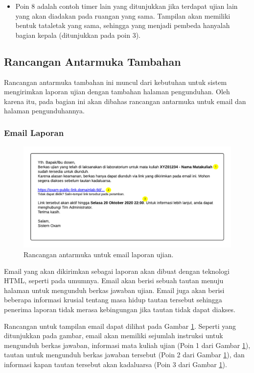 \begin{itemize}
        \item Poin 8 adalah contoh timer lain yang ditunjukkan jika terdapat
            ujian lain yang akan diadakan pada ruangan yang sama. Tampilan akan
            memiliki bentuk tataletak yang sama, sehingga yang menjadi pembeda
            hanyalah bagian kepala (ditunjukkan pada poin 3).
    \end{itemize}
    
    
\subsection{Rancangan Antarmuka Tambahan}
    Rancangan antarmuka tambahan ini muncul dari kebutuhan untuk sistem
    mengirimkan laporan ujian dengan tambahan halaman pengunduhan. Oleh karena
    itu, pada bagian ini akan dibahas rancangan antarmuka untuk email dan
    halaman pengunduhannya.
    
\subsubsection{Email Laporan}
    \begin{figure}
        \centering
        \includegraphics[width=0.7\paperwidth]{Gambar/mockups/Mockup--Tambahan.pdf}
        \caption{Rancangan antarmuka untuk email laporan ujian.}
        \label{fig:mockup_addition_email}
    \end{figure}
    Email yang akan dikirimkan sebagai laporan akan dibuat dengan teknologi
    HTML, seperti pada umumnya. Email akan berisi sebuah tautan menuju halaman
    untuk mengunduh berkas jawaban ujian. Email juga akan berisi beberapa
    informasi krusial tentang masa hidup tautan tersebut sehingga penerima
    laporan tidak merasa kebingungan jika tautan tidak dapat diakses.
    
    Rancangan untuk tampilan email dapat dilihat pada Gambar
    \ref{fig:mockup_addition_email}. Seperti yang ditunjukkan pada gambar, email
    akan memiliki sejumlah instruksi untuk mengunduh berkas jawaban, informasi
    mata kuliah ujian (Poin 1 dari Gambar \ref{fig:mockup_addition_email}),
    tautan untuk mengunduh berkas jawaban tersebut (Poin 2 dari Gambar
    \ref{fig:mockup_addition_email}), dan informasi kapan tautan tersebut akan
    kadaluarsa (Poin 3 dari Gambar \ref{fig:mockup_addition_email}).
    
